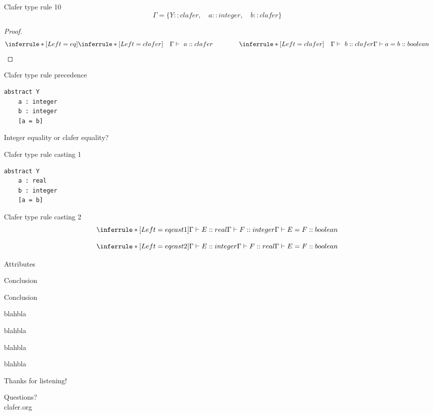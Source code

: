 \documentclass[table,15pt,t]{beamer}
\newcommand{\vmiddle}[1]{
  \vspace{\stretch{1}}
  #1
  \vspace{\stretch{1}}
}
\newcommand{\interframe}[1]{
\begin{frame}{}
\vmiddle{\hmiddle{\Huge #1}}
\end{frame}
}
\newcommand{\mlist}[1]{
\vmiddle{
  \begin{list}{}{}
    #1
  \end{list}
  }
}
\newcommand{\hmiddle}[1]{
  \begin{center}#1\end{center}
}
\begin{document}
\begin{frame}[fragile,c]{Clafer type rule 10}
\begin{equation*}
\Gamma = \{Y::clafer,\quad a::integer,\quad b::clafer\}
\end{equation*}

\begin{proof}
\begin{equation*}
\inferrule* [Left=eq] {
  \inferrule* [Left=clafer]{\quad}{\Gamma\vdash\ a::clafer} \\ \hspace{40pt} 
  \inferrule* [Left=clafer]{\quad}{\Gamma\vdash\ b::clafer}}
{\Gamma\vdash a = b::boolean}
\end{equation*}
\end{proof}
\end{frame}

\begin{frame}[fragile,c]{Clafer type rule precedence}
\begin{lstlisting}
abstract Y
    a : integer
    b : integer
    [a = b]
\end{lstlisting}

\vfill Integer equality or clafer equality?
\end{frame}

\begin{frame}[fragile,c]{Clafer type rule casting 1}
\begin{lstlisting}
abstract Y
    a : real
    b : integer
    [a = b]
\end{lstlisting}
\end{frame}

\begin{frame}[fragile,c]{Clafer type rule casting 2}
\begin{equation*}
\inferrule* [Left=eqcast1] {\Gamma\vdash E::real \\ \Gamma\vdash F::integer}{\Gamma\vdash E = F::boolean}
\end{equation*}

\begin{equation*}
\inferrule* [Left=eqcast2] {\Gamma\vdash E::integer \\ \Gamma\vdash F::real}{\Gamma\vdash E = F::boolean}
\end{equation*}
\end{frame}


\interframe{Attributes}

\interframe{Conclusion}

\begin{frame}{Conclusion}
 \mlist{
    \item blahbla
    \item blahbla
    \item blahbla
    \item blahbla
 }
\end{frame}

\interframe{Thanks for listening!}

\interframe{Questions?\\[1cm]\normalsize{\textsf{clafer.org}}}
\end{document}
